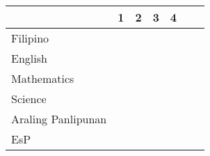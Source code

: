 \documentclass[twocolumn,9pt]{article}
\begin{document}
\begin{tabular}{|L{90pt} | C{18.5pt} | C{18.5pt} | C{18.5pt} | C{18.5pt} | C{36pt} | C{50pt} |}
& 1 & 2 & 3 & 4 & & \\%
\hline
Filipino &  &
 &
 &
 &
 &
 \\%
\hline
English &  &
 &
 &
 &
 &
 \\%
\hline
Mathematics &  &
 &
 &
 &
 &
 \\%
\hline
Science &  &
 &
 &
 &
 &
 \\%
\hline
Araling Panlipunan &  &
 &
 &
 &
 &
 \\%
\hline
EsP &  &
 &
 &
 &
 &

\end{tabular}
\end{document}
